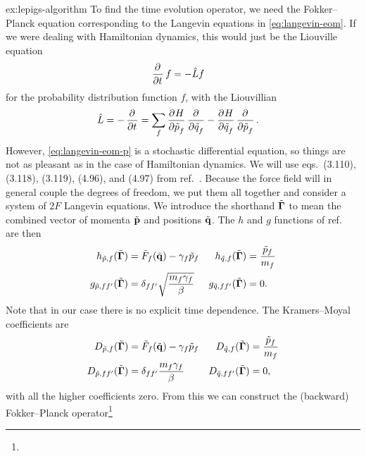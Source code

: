 \begin{DefAnswer}{ex:lepigs-algorithm}
	To find the time evolution operator, we need the Fokker--Planck equation corresponding to the Langevin equations in \cref{eq:langevin-eom}.
	If we were dealing with Hamiltonian dynamics, this would just be the Liouville equation~\cite[32]{zwanzig2001nonequilibrium}
	\begin{align}
		\dpd{}{t} f
		&= -\hat{L} f
	\end{align}
	for the probability distribution function $f$, with the Liouvillian
	\begin{align}
		\hat{L}
		&= -\dpd{}{t}
		= \sum_f \dpd{H}{\nm{p}_f} \dpd{}{\nm{q}_f} - \dpd{H}{\nm{q}_f} \dpd{}{\nm{p}_f}.
	\end{align}
	However, \cref{eq:langevin-eom-p} is a stochastic differential equation, so things are not as pleasant as in the case of Hamiltonian dynamics.
	We will use eqs.~(3.110), (3.118), (3.119), (4.96), and (4.97) from ref.~\cite[54-55,83]{risken1984fokker}.
	Because the force field will in general couple the degrees of freedom, we put them all together and consider a system of $2 F$ Langevin equations.
	We introduce the shorthand $\tilde{\bm{\mathbf{\Gamma}}}$ to mean the combined vector of momenta $\tilde{\bm{\mathbf{p}}}$ and positions $\tilde{\bm{\mathbf{q}}}$.
	The $h$ and $g$ functions of ref.~\cite{risken1984fokker} are then
	\begin{subequations}
	\begin{align}
		h_{\tilde{p},f}(\tilde{\bm{\mathbf{\Gamma}}})
		&= \tilde{F}_f(\tilde{\bm{\mathbf{q}}}) - \gamma_f \tilde{p}_f &
		h_{\tilde{q},f}(\tilde{\bm{\mathbf{\Gamma}}})
		&= \frac{\tilde{p}_f}{m_f} \\
		g_{\tilde{p},ff'}(\tilde{\bm{\mathbf{\Gamma}}})
		&= \delta_{ff'} \sqrt{\frac{m_f \gamma_f}{\beta}} &
		g_{\tilde{q},ff'}(\tilde{\bm{\mathbf{\Gamma}}})
		&= 0.
	\end{align}
	\end{subequations}
	Note that in our case there is no explicit time dependence.
	The Kramers--Moyal coefficients are
	\begin{subequations}
	\begin{align}
		D_{\tilde{p},f}(\tilde{\bm{\mathbf{\Gamma}}})
		&= \tilde{F}_f(\tilde{\bm{\mathbf{q}}}) - \gamma_f \tilde{p}_f &
		D_{\tilde{q},f}(\tilde{\bm{\mathbf{\Gamma}}})
		&= \frac{\tilde{p}_f}{m_f} \\
		D_{\tilde{p},ff'}(\tilde{\bm{\mathbf{\Gamma}}})
		&= \delta_{ff'} \frac{m_f \gamma_f}{\beta} &
		D_{\tilde{q},ff'}(\tilde{\bm{\mathbf{\Gamma}}})
		&= 0,
	\end{align}
	\end{subequations}
	with all the higher coefficients zero.
	From this we can construct the (backward) Fokker--Planck operator\footnote{
}
\end{DefAnswer}
